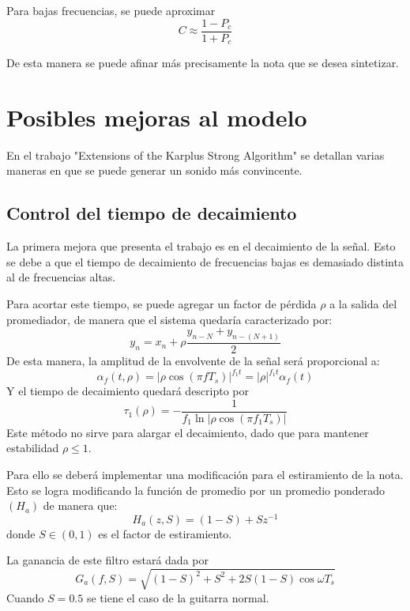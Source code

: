 Para bajas frecuencias, se puede aproximar
\begin{equation*}
    C\approx\frac{1-P_c}{1+P_c}
\end{equation*}

De esta manera se puede afinar más precisamente la nota que se desea sintetizar.

\section{Posibles mejoras al modelo}
En el trabajo "Extensions of the Karplus Strong Algorithm" se detallan varias maneras en que se puede generar un sonido más convincente.

\subsection{Control del tiempo de decaimiento}
La primera mejora que presenta el trabajo es en el decaimiento de la señal. Esto se debe a que el tiempo de decaimiento de frecuencias bajas es demasiado distinta al de frecuencias altas.

Para acortar este tiempo, se puede agregar un factor de pérdida $\rho$ a la salida del promediador, de manera que el sistema quedaría caracterizado por:
\begin{equation*}
    y_n = x_n + \rho \frac{y_{n-N} + y_{n-(N+1)}}{2}
\end{equation*}
De esta manera, la amplitud de la envolvente de la señal será proporcional a:
\begin{equation*}
    \alpha_f(t,\rho)=|\rho \cos(\pi f T_s)|^{f_1 t} = |\rho|^{f_1 t} \alpha_f(t)
\end{equation*}
Y el tiempo de decaimiento quedará descripto por
\begin{equation*}
    \tau_1(\rho) = -\frac{1}{f_1 \ln|\rho \cos(\pi f_1 T_s)|}
\end{equation*}
Este método no sirve para alargar el decaimiento, dado que para mantener estabilidad $\rho \leq 1$.

Para ello se deberá implementar una modificación para el estiramiento de la nota. Esto se logra modificando la función de promedio por un promedio ponderado $(H_a)$ de manera que:
\begin{equation*}
    H_a(z,S) = (1-S) + Sz^{-1}
\end{equation*}
donde $S\in(0,1)$ es el factor de estiramiento.

La ganancia de este filtro estará dada por
\begin{equation*}
    G_a(f,S) = \sqrt{(1-S)^2+S^2+2S(1-S)\cos\omega T_s}
\end{equation*}
Cuando $S = 0.5$ se tiene el caso de la guitarra normal.

